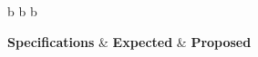 \documentclass[12pt%
                    ]{report}
\begin{document}
\ifthenelse{\isundefined{\gnumericColC}}{\newlength{\gnumericColC}}{}
\begin{tabular}[c]{%
    b{\gnumericColA}%
    b{\gnumericColB}%
    b{\gnumericColC}%
    }







    
\hhline{---}
    {\gnumericPB{\centering}\textbf{Specifications}}
    &%
    {\gnumericPB{\centering}\textbf{Expected}}
    &%
    {\gnumericPB{\centering}\textbf{Proposed}}

\\


\end{tabular}
\end{document}
